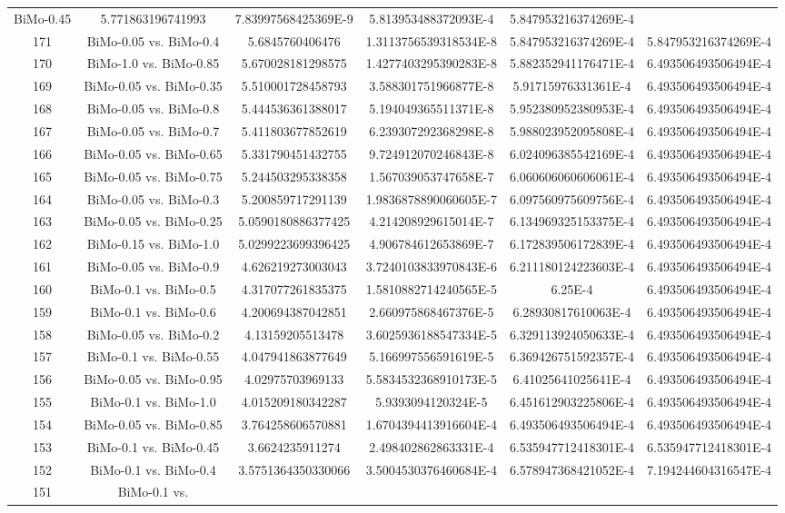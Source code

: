 \documentclass[a4paper,10pt]{article}
\begin{document}
\begin{landscape}
\begin{table}[!htp]
\begin{tabular}{cccccc}
BiMo-0.45&5.771863196741993&7.83997568425369E-9&5.813953488372093E-4&5.847953216374269E-4\\171&BiMo-0.05 vs. BiMo-0.4&5.6845760406476&1.3113756539318534E-8&5.847953216374269E-4&5.847953216374269E-4\\170&BiMo-1.0 vs. BiMo-0.85&5.670028181298575&1.4277403295390283E-8&5.882352941176471E-4&6.493506493506494E-4\\169&BiMo-0.05 vs. BiMo-0.35&5.510001728458793&3.588301751966877E-8&5.91715976331361E-4&6.493506493506494E-4\\168&BiMo-0.05 vs. BiMo-0.8&5.444536361388017&5.194049365511371E-8&5.952380952380953E-4&6.493506493506494E-4\\167&BiMo-0.05 vs. BiMo-0.7&5.411803677852619&6.239307292368298E-8&5.988023952095808E-4&6.493506493506494E-4\\166&BiMo-0.05 vs. BiMo-0.65&5.331790451432755&9.724912070246843E-8&6.024096385542169E-4&6.493506493506494E-4\\165&BiMo-0.05 vs. BiMo-0.75&5.244503295338358&1.567039053747658E-7&6.060606060606061E-4&6.493506493506494E-4\\164&BiMo-0.05 vs. BiMo-0.3&5.200859717291139&1.9836878890060605E-7&6.097560975609756E-4&6.493506493506494E-4\\163&BiMo-0.05 vs. BiMo-0.25&5.0590180886377425&4.214208929615014E-7&6.134969325153375E-4&6.493506493506494E-4\\162&BiMo-0.15 vs. BiMo-1.0&5.0299223699396425&4.906784612653869E-7&6.172839506172839E-4&6.493506493506494E-4\\161&BiMo-0.05 vs. BiMo-0.9&4.626219273003043&3.7240103833970843E-6&6.211180124223603E-4&6.493506493506494E-4\\160&BiMo-0.1 vs. BiMo-0.5&4.317077261835375&1.5810882714240565E-5&6.25E-4&6.493506493506494E-4\\159&BiMo-0.1 vs. BiMo-0.6&4.200694387042851&2.660975868467376E-5&6.28930817610063E-4&6.493506493506494E-4\\158&BiMo-0.05 vs. BiMo-0.2&4.13159205513478&3.6025936188547334E-5&6.329113924050633E-4&6.493506493506494E-4\\157&BiMo-0.1 vs. BiMo-0.55&4.047941863877649&5.166997556591619E-5&6.369426751592357E-4&6.493506493506494E-4\\156&BiMo-0.05 vs. BiMo-0.95&4.02975703969133&5.5834532368910173E-5&6.41025641025641E-4&6.493506493506494E-4\\155&BiMo-0.1 vs. BiMo-1.0&4.015209180342287&5.9393094120324E-5&6.451612903225806E-4&6.493506493506494E-4\\154&BiMo-0.05 vs. BiMo-0.85&3.764258606570881&1.6704394413916604E-4&6.493506493506494E-4&6.493506493506494E-4\\153&BiMo-0.1 vs. BiMo-0.45&3.6624235911274&2.498402862863331E-4&6.535947712418301E-4&6.535947712418301E-4\\152&BiMo-0.1 vs. BiMo-0.4&3.5751364350330066&3.5004530376460684E-4&6.578947368421052E-4&7.194244604316547E-4\\151&BiMo-0.1 vs. 
\end{tabular}
\end{table}
\end{landscape}
\end{document}
